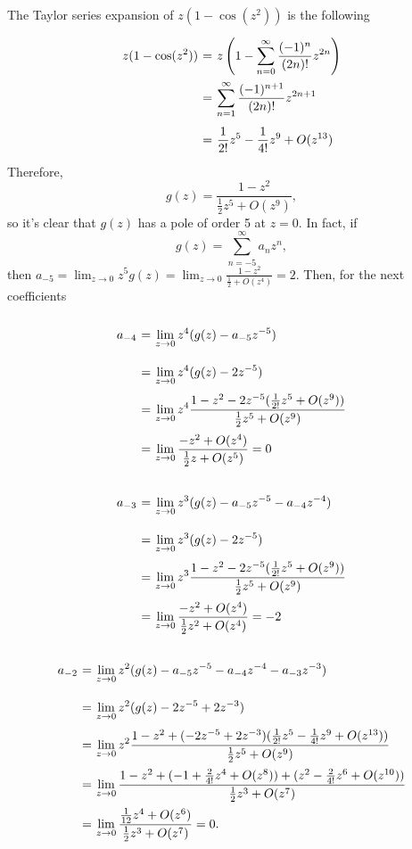 The Taylor series expansion of $z(1-\cos(z^2))$ is the following
\[ \everymath{\displaystyle}
\arraycolsep=1.8pt\def\arraystretch{2.5}
\begin{array}{rcl}
    z(1-\cos(z^2)) & = & z \left( 1 - \sum_{n = 0}^{\infty} \frac{(-1)^n}{(2n)!} z^{2n} \right)\\
    & = & \sum_{n = 1}^{\infty} \frac{(-1)^{n+1}}{(2n)!} z^{2n+1}\\
    & = & \frac{1}{2!} z^5 - \frac{1}{4!} z^9 + O(z^{13})
\end{array} \]
Therefore,
\[ g(z) = \frac{1 - z^2}{\frac{1}{2} z^5 + O(z^9)}, \]
so it's clear that $g(z)$ has a pole of order 5 at $z = 0$. In fact, if
\[ g(z) = \sum_{n = -5}^{\infty} a_{n} z^n, \]
then $a_{-5} = \lim_{z\to 0} z^5 g(z) = \lim_{z\to 0} \frac{1- z^2}{\frac{1}{2} + O(z^4)} = 2$. Then, for the next coefficients
\[ \everymath{\displaystyle}
\arraycolsep=1.8pt\def\arraystretch{2.5}
\begin{array}{rcl}
    a_{-4} & = & \lim_{z\to 0} z^4 (g(z) - a_{-5} z^{-5}) \\
    & = & \lim_{z\to 0} z^4 (g(z) - 2z^{-5})\\
    & = & \lim_{z\to 0} z^4 \frac{1-z^2 - 2z^{-5}(\frac{1}{2!} z^5 + O(z^9))}{\frac{1}{2} z^5 + O(z^9)}\\
    & = & \lim_{z\to 0} \frac{-z^2 + O(z^4)}{\frac{1}{2} z + O(z^5)} = 0
\end{array} \]

\[ \everymath{\displaystyle}
\arraycolsep=1.8pt\def\arraystretch{2.5}
\begin{array}{rcl}
    a_{-3} & = & \lim_{z\to 0} z^3 (g(z) - a_{-5} z^{-5} - a_{-4} z^{-4}) \\
    & = & \lim_{z\to 0} z^3 (g(z) - 2z^{-5})\\
    & = & \lim_{z\to 0} z^3 \frac{1-z^2 - 2z^{-5}(\frac{1}{2!} z^5 + O(z^9))}{\frac{1}{2} z^5 + O(z^9)}\\
    & = & \lim_{z\to 0} \frac{-z^2 + O(z^4)}{\frac{1}{2} z^2 + O(z^4)} = -2
\end{array} \]

\[ \everymath{\displaystyle}
\arraycolsep=1.8pt\def\arraystretch{2.5}
\begin{array}{rcl}
    a_{-2} & = & \lim_{z\to 0} z^2 (g(z) - a_{-5} z^{-5} - a_{-4} z^{-4} - a_{-3} z^{-3}) \\
    & = & \lim_{z\to 0} z^2 (g(z) - 2z^{-5} + 2z^{-3})\\
    & = & \lim_{z\to 0} z^2 \frac{1-z^2 + (- 2z^{-5} + 2z^{-3})(\frac{1}{2!} z^5 - \frac{1}{4!} z^9 + O(z^{13}))}{\frac{1}{2} z^5 + O(z^9)}\\
    & = & \lim_{z\to 0} \frac{1 - z^2 + (-1 + \frac{2}{4!} z^{4} + O(z^8)) + (z^2 - \frac{2}{4!} z^{6} + O(z^{10}))}{\frac{1}{2} z^3 + O(z^7)}\\
    & = & \lim_{z\to 0} \frac{\frac{1}{12} z^{4} + O(z^6) }{\frac{1}{2}z^3 + O(z^7)} = 0.
\end{array} \]

